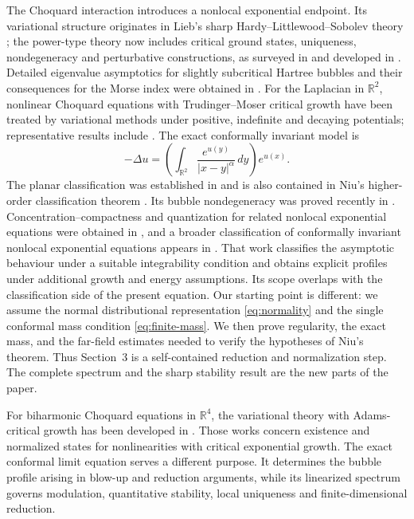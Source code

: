 \documentclass[11pt]{article}
\numberwithin{equation}{section}
\begin{document}
The Choquard interaction introduces a nonlocal exponential endpoint. Its
variational structure originates in Lieb's sharp
Hardy--Littlewood--Sobolev theory \cite{LiebChoquard,LiebSharp}; the power-type
theory now includes critical ground states, uniqueness, nondegeneracy and
perturbative constructions, as surveyed in \cite{MorozVanSchaftingen} and
developed in
\cite{MorozVanSchaftingenCrit,CassaniZhang,CassaniVanSchaftingenZhang,VanSchaftingenXia,MaZhao,DuYang,GaoMorozYangZhao,SquassinaYangZhao,LiLiuTangXu}.
Detailed eigenvalue asymptotics for slightly subcritical Hartree bubbles and
their consequences for the Morse index were obtained in
\cite{CannoneCingolaniYangZhao}. For the Laplacian in \(\mathbb R^{2}\), nonlinear Choquard equations with
Trudinger--Moser critical growth have been treated by variational methods under
positive, indefinite and decaying potentials; representative results include
\cite{QinTang,CarvalhoMedeirosRibeiro}. The exact conformally invariant model is
\[
-\Delta u
=\left(\int_{\mathbb R^{2}}\frac{e^{u(y)}}{|x-y|^{\alpha}}\,dy\right)e^{u(x)}.
\]
The planar classification was established in \cite{GluckPlanar} and is also
contained in Niu's higher-order classification theorem
\cite{NiuClassification}. Its bubble nondegeneracy was proved recently in
\cite{GaoLiMa}. Concentration--compactness and quantization for related
nonlocal exponential equations were obtained in \cite{Gluck}, and a broader
classification of conformally invariant nonlocal exponential equations appears
in \cite{GluckMarasinghe}. That work classifies the asymptotic behaviour under
a suitable integrability condition and obtains explicit profiles under
additional growth and energy assumptions. Its scope overlaps with the
classification side of the present equation. Our starting point is different:
we assume the normal distributional representation \eqref{eq:normality} and the
single conformal mass condition \eqref{eq:finite-mass}. We then prove
regularity, the exact mass, and the far-field estimates needed to verify the
hypotheses of Niu's theorem. Thus Section~3 is a self-contained reduction and
normalization step. The complete spectrum and the sharp stability result are
the new parts of the paper.

For biharmonic Choquard equations in \(\mathbb R^{4}\), the variational theory
with Adams-critical growth has been developed in
\cite{ChenWangZAMP,ChenLiWang,ChenWangPEMS}. Those works concern existence and
normalized states for nonlinearities with critical exponential growth. The
exact conformal limit equation serves a different purpose. It determines the
bubble profile arising in blow-up and reduction arguments, while its
linearized spectrum governs modulation, quantitative stability, local
uniqueness and finite-dimensional reduction.
\end{document}

